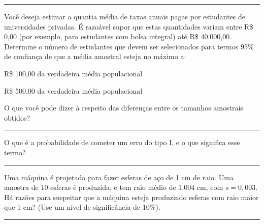 \documentclass[a4paper,11pt,fleqn]{article}\usepackage[]{graphicx}\usepackage[]{color}
\theoremstyle{definition}
\begin{document}
\vspace{0.3cm}
\hrule
\vspace{0.3cm}

\begin{compactenum}[12.] %
\item Você deseja estimar a quantia média de taxas anuais pagas por
  estudantes de universidades privadas. É razoável supor que estas
  quantidades variam entre R\$ 0,00 (por exemplo, para estudantes com
  bolsa integral) até R\$ 40.000,00. Determine o número de estudantes
  que devem ser selecionados para termos 95\% de confiança de que a
  média amostral esteja no máximo a:
  \begin{compactenum}
  \item R\$ 100,00 da verdadeira média populacional
  \item R\$ 500,00 da verdadeira média populacional
  \end{compactenum}
  O que você pode dizer à respeito das diferenças entre os tamanhos
  amostrais obtidos?
\end{compactenum}

\vspace{0.3cm}
\hrule
\vspace{0.3cm}


\begin{compactenum}[13.]
\item O que é a probabilidade de cometer um erro do tipo I, e o que
  significa esse termo?
\end{compactenum}

\vspace{0.3cm}
\hrule
\vspace{0.3cm}

\begin{compactenum}[14.]
\item Uma máquina é projetada para fazer esferas de aço de 1 cm de
  raio. Uma amostra de 10 esferas é produzida, e tem raio médio de 1,004
  cm, com $s = 0,003$. Há razões para suspeitar que a máquina esteja
  produzindo esferas com raio maior que 1 cm? (Use um nível de
  significância de 10\%).
\end{compactenum}

\vspace{0.3cm}
\hrule
\vspace{0.3cm}
\end{document}

